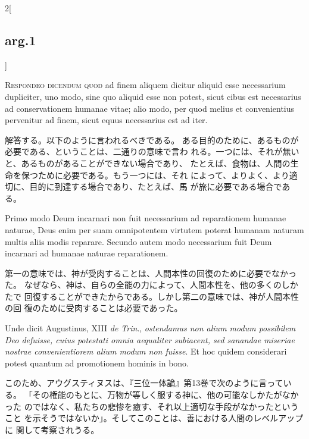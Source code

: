 \documentclass[paper=a4paper,fontsize=10pt,jafontsize=9pt,titlepage]{jlreq}
\begin{document}
\begin{paracol}{2}[\subsection{arg.1}]

{\scshape Respondeo dicendum quod} ad finem aliquem dicitur aliquid esse
 necessarium dupliciter, uno modo, sine quo aliquid esse non potest,
 sicut cibus est necessarius ad conservationem humanae vitae; alio modo,
 per quod melius et convenientius pervenitur ad finem, sicut equus
 necessarius est ad iter.

\switchcolumn

解答する。以下のように言われるべきである。
ある目的のために、あるものが必要である、ということは、二通りの意味で言わ
 れる。一つには、それが無いと、あるものがあることができない場合であり、
 たとえば、食物は、人間の生命を保つために必要である。もう一つには、それ
 によって、よりよく、より適切に、目的に到達する場合であり、たとえば、馬
 が旅に必要である場合である。

\switchcolumn*

Primo modo Deum incarnari non fuit necessarium
 ad reparationem humanae naturae, Deus enim per suam omnipotentem
 virtutem poterat humanam naturam multis aliis modis reparare. Secundo
 autem modo necessarium fuit Deum incarnari ad humanae naturae
 reparationem.

\switchcolumn

第一の意味では、神が受肉することは、人間本性の回復のために必要でなかった。
 なぜなら、神は、自らの全能の力によって、人間本性を、他の多くのしかたで
 回復することができたからである。しかし第二の意味では、神が人間本性の回
 復のために受肉することは必要であった。

\switchcolumn*

Unde dicit Augustinus, XIII {\itshape de Trin}., {\itshape ostendamus non
 alium modum possibilem Deo defuisse, cuius potestati omnia aequaliter
 subiacent, sed sanandae miseriae nostrae convenientiorem alium modum
 non fuisse}. Et hoc quidem considerari potest quantum ad promotionem
 hominis in bono.

\switchcolumn

このため、アウグスティヌスは、『三位一体論』第13巻で次のように言っている。
 「その権能のもとに、万物が等しく服する神に、他の可能なしかたがなかった
 のではなく、私たちの悲惨を癒す、それ以上適切な手段がなかったということ
 を示そうではないか」。そしてこのことは、善における人間のレベルアップに
 関して考察されうる。

\switchcolumn*


\end{paracol}
\end{document}
